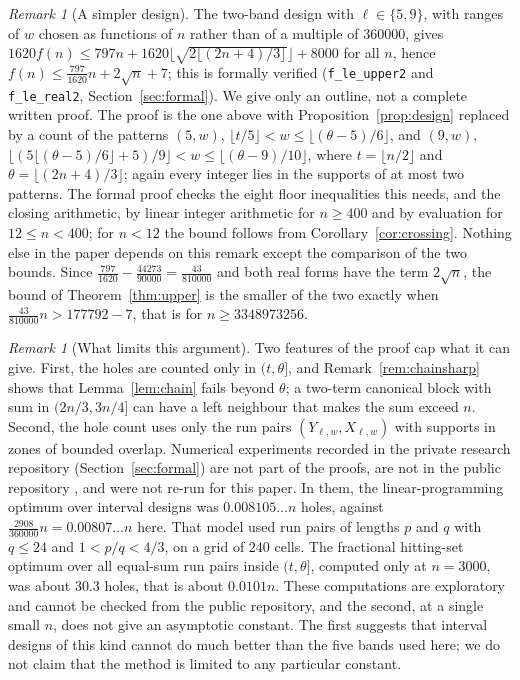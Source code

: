 \documentclass[11pt]{amsart}
\theoremstyle{remark}
\newtheorem{remark}[theorem]{Remark}
\newcommand{\isqrt}[1]{\lfloor\sqrt{#1}\rfloor}
\begin{document}
\begin{remark}[A simpler design]\label{rem:797}
The two-band design with $\ell\in\{5,9\}$, with ranges of $w$ chosen as functions of $n$ rather than of a multiple of $360000$, gives
$1620f(n)\le797n+1620\isqrt{2\lfloor(2n+4)/3\rfloor}+8000$ for all $n$, hence $f(n)\le\frac{797}{1620}n+2\sqrt n+7$; this is formally
verified (\texttt{f\_le\_upper2} and \texttt{f\_le\_real2}, Section~\ref{sec:formal}). We give only an outline, not a complete written
proof. The proof is the one above with Proposition~\ref{prop:design} replaced by a count of the patterns $(5,w)$,
$\lfloor t/5\rfloor<w\le\lfloor(\theta-5)/6\rfloor$, and $(9,w)$, $\lfloor(5\lfloor(\theta-5)/6\rfloor+5)/9\rfloor<w\le\lfloor(\theta-9)/10\rfloor$,
where $t=\lfloor n/2\rfloor$ and $\theta=\lfloor(2n+4)/3\rfloor$; again every integer lies in the supports of at most two patterns. The formal
proof checks the eight floor inequalities this needs, and the closing arithmetic, by linear integer arithmetic for $n\ge400$ and by
evaluation for $12\le n<400$; for $n<12$ the bound follows from Corollary~\ref{cor:crossing}. Nothing else in the paper depends on this
remark except the comparison of the two bounds. Since $\frac{797}{1620}-\frac{44273}{90000}=\frac{43}{810000}$ and both real forms
have the term $2\sqrt n$, the bound of Theorem~\ref{thm:upper} is the smaller of the two exactly when $\frac{43}{810000}n>177792-7$, that is
for $n\ge3348973256$.
\end{remark}

\begin{remark}[What limits this argument]\label{rem:upperlimits}
Two features of the proof cap what it can give. First, the holes are counted only in $(t,\theta]$, and Remark~\ref{rem:chainsharp} shows
that Lemma~\ref{lem:chain} fails beyond $\theta$; a two-term canonical block with sum in $(2n/3,3n/4]$ can have a left neighbour that
makes the sum exceed $n$. Second, the hole count uses only the run pairs $(Y_{\ell,w},X_{\ell,w})$ with supports in zones of bounded
overlap. Numerical experiments recorded in the private research repository (Section~\ref{sec:formal}) are not part of the proofs, are not in
the public repository \cite{Artifact}, and were not re-run for this paper. In them, the linear-programming optimum over interval designs was $0.008105\ldots n$ holes, against $\frac{2908}{360000}n=0.00807\ldots n$
here. That model used run pairs of lengths $p$ and $q$ with $q\le24$ and $1<p/q<4/3$, on a grid of $240$ cells. The fractional
hitting-set optimum over all equal-sum run pairs inside $(t,\theta]$, computed only at $n=3000$, was about $30.3$ holes, that is about
$0.0101n$. These computations are exploratory and cannot be checked from the public repository, and the second, at a single small $n$, does
not give an asymptotic constant. The first suggests that interval designs of this kind cannot do much better than the five bands used
here; we do not claim that the method is limited to any particular constant.
\end{remark}
\end{document}
